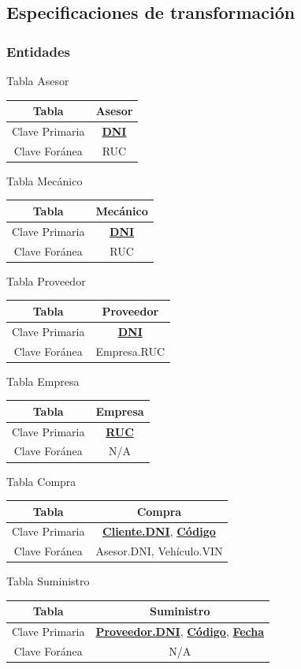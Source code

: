 \documentclass[12pt]{article}
\begin{document}
\subsection{Especificaciones de transformaci\'on}

\subsubsection{Entidades}

Tabla Asesor
\begin{tabular}{|c|c|}
\hline
Tabla & Asesor \\
\hline
Clave Primaria & \textbf{\underline{DNI}} \\
\hline
Clave Foránea & RUC \\
\hline
\end{tabular}

Tabla Mecánico
\begin{tabular}{|c|c|}
\hline
Tabla & Mecánico \\
\hline
Clave Primaria & \textbf{\underline{DNI}} \\
\hline
Clave Foránea & RUC \\
\hline
\end{tabular}

Tabla Proveedor
\begin{tabular}{|c|c|}
\hline
Tabla & Proveedor \\
\hline
Clave Primaria & \textbf{\underline{DNI}} \\
\hline
Clave Foránea & Empresa.RUC \\
\hline
\end{tabular}

Tabla Empresa
\begin{tabular}{|c|c|}
\hline
Tabla & Empresa \\
\hline
Clave Primaria & \textbf{\underline{RUC}} \\
\hline
Clave Foránea & N/A \\
\hline
\end{tabular}

Tabla Compra
\begin{tabular}{|c|c|}
\hline
Tabla & Compra \\
\hline
Clave Primaria & \textbf{\underline{Cliente.DNI}}, \textbf{\underline{Código}} \\
\hline
Clave Foránea & Asesor.DNI, Vehículo.VIN \\
\hline
\end{tabular}

Tabla Suministro
\begin{tabular}{|c|c|}
\hline
Tabla & Suministro \\
\hline
Clave Primaria & \textbf{\underline{Proveedor.DNI}}, \textbf{\underline{Código}}, \textbf{\underline{Fecha}} \\
\hline
Clave Foránea & N/A \\
\hline
\end{tabular}
\end{document}
